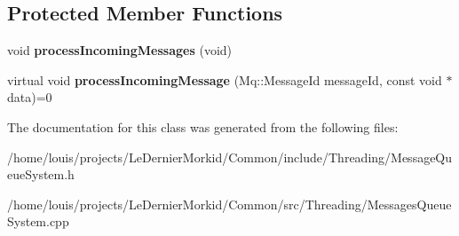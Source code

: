\subsection*{Protected Member Functions}
\begin{DoxyCompactItemize}
\item 
\mbox{\label{class_common_1_1_mq_1_1_message_queue_system_abc956172e5948e71547202f429e5e505}} 
void {\bfseries process\+Incoming\+Messages} (void)
\item 
\mbox{\label{class_common_1_1_mq_1_1_message_queue_system_ad6eb849b72f03e3e4f09c6457c8ecda6}} 
virtual void {\bfseries process\+Incoming\+Message} (Mq\+::\+Message\+Id message\+Id, const void $\ast$data)=0
\end{DoxyCompactItemize}


The documentation for this class was generated from the following files\+:\begin{DoxyCompactItemize}
\item 
/home/louis/projects/\+Le\+Dernier\+Morkid/\+Common/include/\+Threading/Message\+Queue\+System.\+h\item 
/home/louis/projects/\+Le\+Dernier\+Morkid/\+Common/src/\+Threading/Messages\+Queue\+System.\+cpp\end{DoxyCompactItemize}
